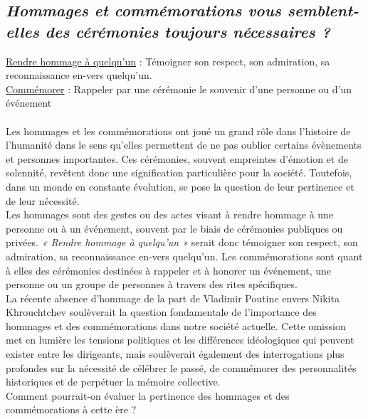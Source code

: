 \begin{center}
	\subsection*{\textit{Hommages et commémorations vous semblent-elles des cérémonies toujours nécessaires ?}}
\end{center}
\underline{Rendre hommage à quelqu’un} : Témoigner son respect, son admiration, sa reconnaissance en-vers quelqu’un.\\
\underline{Commémorer} : Rappeler par une cérémonie le souvenir d’une personne ou d’un événement\\\\
\hspace*{0.5cm}Les hommages et les commémorations ont joué un grand rôle dans l’histoire de l'humanité dans le sens qu’elles permettent de ne pas oublier certains évènements et personnes importantes. Ces cérémonies, souvent empreintes d'émotion et de solennité, revêtent donc une signification particulière pour la société. Toutefois, dans un monde en constante évolution, se pose la question de leur pertinence et de leur nécessité.\\
\hspace*{0.5cm}Les hommages sont des gestes ou des actes visant à rendre hommage à une personne ou à un événement, souvent par le biais de cérémonies publiques ou privées. \textit{« Rendre hommage à quelqu’un »} serait donc témoigner son respect, son admiration, sa reconnaissance en-vers quelqu’un. Les commémorations sont quant à elles des cérémonies destinées à rappeler et à honorer un événement, une personne ou un groupe de personnes à travers des rites spécifiques.\\
\hspace*{0.5cm}La récente absence d’hommage de la part de Vladimir Poutine envers Nikita Khrouchtchev soulèverait la question fondamentale de l’importance des hommages et des commémorations dans notre société actuelle. Cette omission met en lumière les tensions politiques et les différences idéologiques qui peuvent exister entre les dirigeants, mais soulèverait également des interrogations plus profondes sur la nécessité de célébrer le passé, de commémorer des personnalités historiques et de perpétuer la mémoire collective.\\
\hspace*{0.5cm}Comment pourrait-on évaluer la pertinence des hommages et des commémorations à cette ère ?\\
